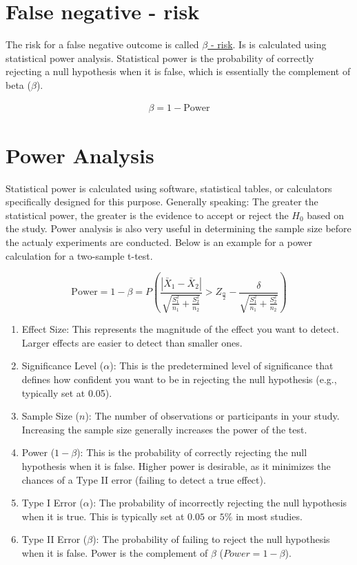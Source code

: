 \documentclass[
  a4paper,
]{scrbook}
\begin{document}
\section{False negative - risk}\label{false-negative---risk}

The risk for a false negative outcome is called
\hyperref[beta-risk]{\(\beta\) - risk}. Is is calculated using
statistical power analysis. Statistical power is the probability of
correctly rejecting a null hypothesis when it is false, which is
essentially the complement of beta (\(\beta\)).

\begin{align}
\beta = 1 - \text{Power}
\end{align}

\section{Power Analysis}\label{power-analysis}

Statistical power is calculated using software, statistical tables, or
calculators specifically designed for this purpose. Generally speaking:
The greater the statistical power, the greater is the evidence to accept
or reject the \(H_0\) based on the study. Power analysis is also very
useful in determining the sample size before the actualy experiments are
conducted. Below is an example for a power calculation for a two-sample
t-test.

\[
\text{Power} = 1 - \beta = P\left(\frac{{|\bar{X}_1 - \bar{X}_2|}}{\sqrt{\frac{S_1^2}{n_1} + \frac{S_2^2}{n_2}}} > Z_{\frac{\alpha}{2}} - \frac{\delta}{\sqrt{\frac{S_1^2}{n_1} + \frac{S_2^2}{n_2}}}\right)
\]

\begin{enumerate}
\def\labelenumi{\arabic{enumi}.}
\item
  Effect Size: This represents the magnitude of the effect you want to
  detect. Larger effects are easier to detect than smaller ones.
\item
  Significance Level (\(\alpha\)): This is the predetermined level of
  significance that defines how confident you want to be in rejecting
  the null hypothesis (e.g., typically set at 0.05).
\item
  Sample Size (\(n\)): The number of observations or participants in
  your study. Increasing the sample size generally increases the power
  of the test.
\item
  Power (\(1 - \beta\)): This is the probability of correctly rejecting
  the null hypothesis when it is false. Higher power is desirable, as it
  minimizes the chances of a Type II error (failing to detect a true
  effect).
\item
  Type I Error (\(\alpha\)): The probability of incorrectly rejecting
  the null hypothesis when it is true. This is typically set at \(0.05\)
  or \(5\%\) in most studies.
\item
  Type II Error (\(\beta\)): The probability of failing to reject the
  null hypothesis when it is false. Power is the complement of \(\beta\)
  (\(Power = 1 - \beta\)).
\end{enumerate}
\end{document}
